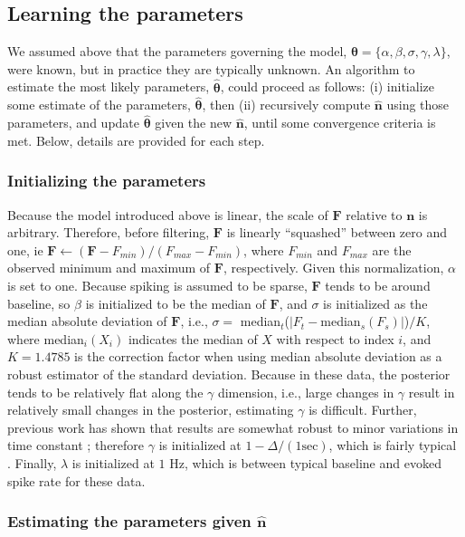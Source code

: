 \documentclass{article}
\providecommand{\ve}[1]{\boldsymbol{#1}}
\newcommand{\thetn}{\ve{\theta}}
\newcommand{\thet}{\thetn}
\newcommand{\vth}{\ve{\thet}}
\newcommand{\hbth}{\widehat{\thet}}
\newcommand{\bn}{\ve{n}}
\newcommand{\bF}{\ve{F}}
\newcommand{\hbn}{\widehat{\ve{n}}}
\newcommand{\Del}{\Delta}
\newcommand{\sig}{\sigma}
\newcommand{\lam}{\lambda}
\newcommand{\gam}{\gamma}
\begin{document}
\subsection{Learning the parameters} \label{sec:learn}

We assumed above that the parameters governing the model, $\vth=\{\alpha, \beta, \sig, \gam, \lam\}$, were known, but in practice they are typically unknown. An algorithm to estimate the most likely parameters, $\hbth$, could proceed as follows: (i) initialize some estimate of the parameters, $\hbth$, then (ii) recursively compute $\hbn$ using those parameters, and update $\hbth$ given the new $\hbn$, until some convergence criteria is met.  Below, details are provided for each step.

\subsubsection{Initializing the parameters} \label{sec:init}

Because the model introduced above is linear, the scale of $\bF$ relative to $\bn$ is arbitrary.  Therefore, before filtering, $\bF$ is linearly ``squashed'' between zero and one, ie $\bF \leftarrow (\bF - F_{min})/(F_{max}-F_{min})$, where $F_{min}$ and $F_{max}$ are the observed minimum and maximum of $\bF$, respectively.  Given this normalization, $\alpha$ is set to one.  Because spiking is assumed to be sparse, $\bF$ tends to be around baseline, so $\beta$ is initialized to be the median of $\bF$, and $\sig$ is initialized as the median absolute deviation of $\bF$, i.e.,  $\sig=$ median$_t$($|F_t-$median$_s(F_s)|$)$/K$, where median$_i(X_i)$ indicates the median of $X$ with respect to index $i$, and $K=1.4785$ is the correction factor when using median absolute deviation as a robust estimator of the standard deviation.  Because in these data, the posterior tends to be relatively flat along the $\gam$ dimension, i.e.,  large changes in $\gam$ result in relatively small changes in the posterior, estimating $\gam$ is difficult.  Further, previous work has shown that results are somewhat robust to minor variations in time constant \cite{YaksiFriedrich06}; therefore $\gam$ is initialized at $1-\Del/(1 \text{sec})$, which is fairly typical \cite{PologrutoSvoboda04}. Finally, $\lam$ is initialized at $1$ Hz, which is between typical baseline and evoked spike rate for these data.

\subsubsection{Estimating the parameters given $\widehat{\mathbf{n}}$} \label{sec:242}
\end{document}
